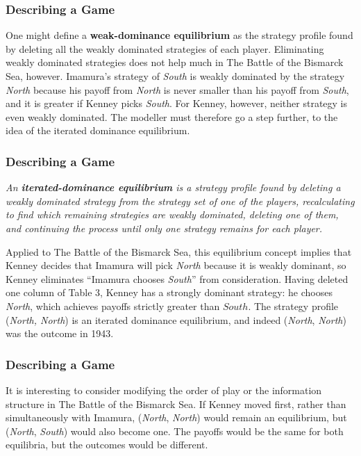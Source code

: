  \begin{frame}[fragile]\frametitle{Describing a Game}
   One might define a  {\bf weak-dominance  equilibrium} as the strategy profile
found by deleting all the weakly dominated strategies of each player.
Eliminating weakly dominated strategies does not help much in The  Battle of the
Bismarck Sea, however.    Imamura's strategy of {\it South} is weakly dominated
by the strategy {\it North}  because his payoff from {\it North} is never
smaller than his payoff from {\it South}, and  it is greater if Kenney picks
{\it South}.  For Kenney, however,  neither strategy is  even weakly dominated.
The modeller must therefore  go a step further, to the  idea of the iterated
dominance equilibrium.
\end{frame}


 \begin{frame}[fragile]\frametitle{Describing a Game}
  {\it An {\bf iterated-dominance equilibrium} is a strategy profile
found by deleting a weakly dominated strategy from the strategy set of one of
the players, recalculating to find which remaining strategies are weakly
dominated, deleting one of them, and continuing the process until only one
strategy remains for each player.}

    Applied to  The   Battle of the Bismarck Sea,  this equilibrium concept
implies that   Kenney  decides that Imamura will pick {\it North} because it is
weakly dominant, so Kenney eliminates  ``Imamura chooses {\it South}'' from
consideration.  Having deleted one column of Table  3, Kenney   has a strongly
dominant strategy:  he chooses {\it North}, which  achieves payoffs   strictly
greater than  $South$.  The strategy profile ({\it North, North}) is an iterated
dominance equilibrium, and indeed ({\it North}, {\it North}) was the outcome in
1943.
\end{frame}


 \begin{frame}[fragile]\frametitle{Describing a Game}
  It is interesting to consider modifying the order of play or the information
structure in The  Battle of the Bismarck Sea.  If Kenney moved first, rather
than simultaneously with Imamura, ({\it North}, {\it North}) would remain an
equilibrium, but ({\it North}, {\it South}) would also become one. The payoffs
would be the same for both equilibria, but the outcomes would be different.
\end{frame}

